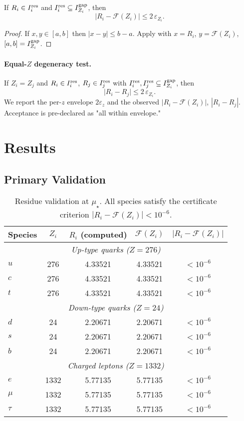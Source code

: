 \documentclass[11pt]{article}
\begin{document}
\begin{lemma}
\label{lem:cert}
If $R_i \in I^{\rm res}_i$ and $I^{\rm res}_i \subseteq I^{\rm gap}_{Z_i}$, then
\[
\bigl|R_i - \mathcal{F}(Z_i)\bigr| \le 2\,\varepsilon_{Z_i}.
\]
\end{lemma}

\begin{proof}
If $x,y\in [a,b]$ then $|x-y|\le b-a$. Apply with $x=R_i$, $y=\mathcal{F}(Z_i)$, $[a,b]=I^{\rm gap}_{Z_i}$.
\end{proof}

\paragraph{Equal-$Z$ degeneracy test.}
If $Z_i=Z_j$ and $R_i\in I^{\rm res}_i$, $R_j\in I^{\rm res}_j$ with $I^{\rm res}_{i},I^{\rm res}_{j}\subseteq I^{\rm gap}_{Z_i}$, then
\[
\bigl|R_i - R_j\bigr| \le 2\,\varepsilon_{Z_i}.
\]
We report the per-$z$ envelope $2\varepsilon_z$ and the observed $|R_i-\mathcal{F}(Z_i)|$, $|R_i-R_j|$.
Acceptance is pre-declared as "all within envelope."

\section{Results}

\subsection{Primary Validation}

\begin{table}[h]
\centering
\begin{tabular}{lcccc}
\toprule
Species & $Z_i$ & $R_i$ (computed) & $\mathcal{F}(Z_i)$ & $|R_i - \mathcal{F}(Z_i)|$ \\
\midrule
\multicolumn{5}{c}{\textit{Up-type quarks ($Z = 276$)}} \\
$u$ & 276 & 4.33521 & 4.33521 & $< 10^{-6}$ \\
$c$ & 276 & 4.33521 & 4.33521 & $< 10^{-6}$ \\
$t$ & 276 & 4.33521 & 4.33521 & $< 10^{-6}$ \\
\midrule
\multicolumn{5}{c}{\textit{Down-type quarks ($Z = 24$)}} \\
$d$ & 24 & 2.20671 & 2.20671 & $< 10^{-6}$ \\
$s$ & 24 & 2.20671 & 2.20671 & $< 10^{-6}$ \\
$b$ & 24 & 2.20671 & 2.20671 & $< 10^{-6}$ \\
\midrule
\multicolumn{5}{c}{\textit{Charged leptons ($Z = 1332$)}} \\
$e$ & 1332 & 5.77135 & 5.77135 & $< 10^{-6}$ \\
$\mu$ & 1332 & 5.77135 & 5.77135 & $< 10^{-6}$ \\
$\tau$ & 1332 & 5.77135 & 5.77135 & $< 10^{-6}$ \\
\bottomrule
\end{tabular}
\caption{Residue validation at $\mu_\star$. All species satisfy the certificate criterion $|R_i - \mathcal{F}(Z_i)| < 10^{-6}$.}
\label{tab:validation}
\end{table}
\end{document}
